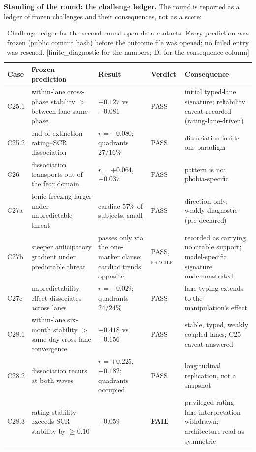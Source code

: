 \documentclass[9pt,twocolumn]{article}
\newcommand{\tier}[1]{{\sffamily\scriptsize\color{RRHMSlate}[#1]}}
\begin{document}
\textbf{Standing of the round: the challenge ledger.} The round is reported as a ledger of frozen challenges and their consequences, not as a score:

\begin{table}[!t]
\centering
\caption{Challenge ledger for the second-round open-data contacts. Every prediction was frozen (public commit hash) before the outcome file was opened; no failed entry was rescued. \tier{finite\_diagnostic for the numbers; Dr for the consequence column}}
\label{tab:ledger}
\small
\begin{tabularx}{\textwidth}{p{}p{}p{}p{}X}
\toprule
\textbf{Case} & \textbf{Frozen prediction} & \textbf{Result} & \textbf{Verdict} & \textbf{Consequence} \\
\midrule
C25.1 & within-lane cross-phase stability $>$ between-lane same-phase & $+0.127$ vs $+0.081$ & PASS & initial typed-lane signature; reliability caveat recorded (rating-lane-driven) \\
C25.2 & end-of-extinction rating--SCR dissociation & $r=-0.080$; quadrants 27/16\% & PASS & dissociation inside one paradigm \\
C26 & dissociation transports out of the fear domain & $r=+0.064$, $+0.037$ & PASS & pattern is not phobia-specific \\
C27a & tonic freezing larger under unpredictable threat & cardiac $57\%$ of subjects, small & PASS & direction only; weakly diagnostic (pre-declared) \\
C27b & steeper anticipatory gradient under predictable threat & passes only via the one-marker clause; cardiac trends opposite & PASS, \textsc{frag\-ile} & recorded as carrying no citable support; model-specific signature undemonstrated \\
C27c & unpredictability effect dissociates across lanes & $r=-0.029$; quadrants 24/24\% & PASS & lane typing extends to the manipulation's effect \\
C28.1 & within-lane six-month stability $>$ same-day cross-lane convergence & $+0.418$ vs $+0.156$ & PASS & stable, typed, weakly coupled lanes; C25 caveat answered \\
C28.2 & dissociation recurs at both waves & $r=+0.225$, $+0.182$; quadrants occupied & PASS & longitudinal replication, not a snapshot \\
C28.3 & rating stability exceeds SCR stability by $\ge0.10$ & $+0.059$ & \textbf{FAIL} & privileged-rating-lane interpretation withdrawn; architecture read as symmetric \\
\bottomrule
\end{tabularx}
\end{table}
\end{document}
